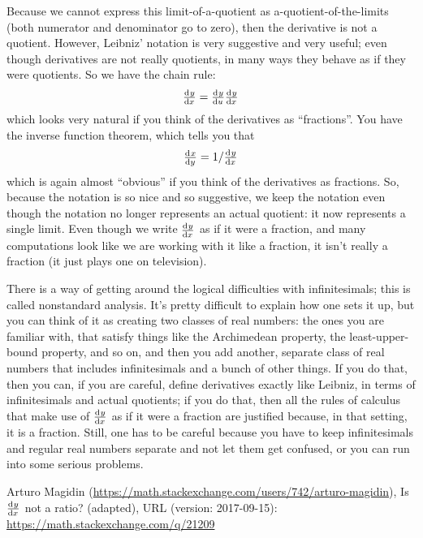 Because we cannot express this limit-of-a-quotient as a-quotient-of-the-limits (both numerator and denominator go to zero), then the derivative is not a quotient.
However, Leibniz' notation is very suggestive and very useful; even though derivatives are not really quotients, in many ways they behave as if they were quotients. So we have the chain rule:
\begin{displaymath}
  \od{y}{x} = \od{y}{u} \od{y}{x}
\end{displaymath}
which looks very natural if you think of the derivatives as ``fractions''. You have the inverse function theorem, which tells you that
\begin{displaymath}
  \od{x}{y} = 1/\od{y}{x}
\end{displaymath}
which is again almost ``obvious'' if you think of the derivatives as fractions. So, because the notation is so nice and so suggestive, we keep the notation even though the notation no longer represents an actual quotient: it now represents a single limit.  Even though we write $ \od{y}{x} $ as if it were a fraction, and many computations look like we are working with it like a fraction, it isn't really a fraction (it just plays one on television).

There is a way of getting around the logical difficulties with infinitesimals; this is called nonstandard analysis. It's pretty difficult to explain how one sets it up, but you can think of it as creating two classes of real numbers: the ones you are familiar with, that satisfy things like the Archimedean property, the least-upper-bound property, and so on, and then you add another, separate class of real numbers that includes infinitesimals and a bunch of other things. If you do that, then you can, if you are careful, define derivatives exactly like Leibniz, in terms of infinitesimals and actual quotients; if you do that, then all the rules of calculus that make use of $ \od{y}{x} $ as if it were a fraction are justified because, in that setting, it is a fraction. Still, one has to be careful because you have to keep infinitesimals and regular real numbers separate and not let them get confused, or you can run into some serious problems.

\begin{flushright}
  Arturo Magidin (\url{https://math.stackexchange.com/users/742/arturo-magidin}), Is $\od{y}{x}$ not a ratio? (adapted), URL (version: 2017-09-15): \url{https://math.stackexchange.com/q/21209}
\end{flushright}


